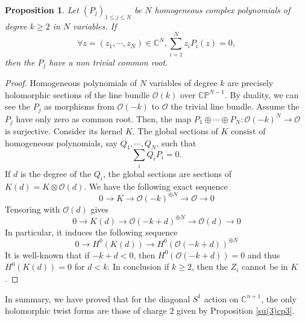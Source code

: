 \documentclass[12pt, reqno]{amsart}
\newtheorem{prop}[Def]{Proposition}
\newcommand{\C}{\mathbb{C}}
\newcommand{\p}{\mathbb{P}}
\newcommand{\Or}{\mathcal{O}}
\begin{document}
   \begin{prop}\label{nonexistence}
       Let $(P_j)_{1\leq j\leq N}$ be $N$ homogeneous complex polynomials of degree $k\geq 2$ in $N$ variables. If \[\forall z=(z_1,\cdots,z_N)\in\C^N,\sum_{i=1}^Nz_iP_i(z)=0,\] then the $P_j$ have a non trivial common root.  
   \end{prop}
\begin{proof}
 Homogeneous polynomials of $N$ variables of degree $k$ are precisely holomorphic sections of the line bundle $\Or(k)$ over $\C\p^{N-1}$. By duality, we can see the $P_j$ as morphisms from $\Or(-k)$ to $\Or$ the trivial line bundle. Assume the $P_j$ have only zero as common root. Then, the map $P_1\oplus\cdots\oplus P_N : \Or(-k)^N\to\Or$ is surjective. Consider its kernel $K$. The global sections of $K$ consist of homogeneous polynomials, say $Q_1,\cdots,Q_N$, such that \[\sum_iQ_iP_i=0.\] If $d$ is the degree of the $Q_i$, the global sections are sections of $K(d)=K\otimes\Or(d)$. We have the following exact sequence \[0\longrightarrow K\longrightarrow\Or(-k)^{\oplus N}\longrightarrow \Or\longrightarrow 0\]  Tensoring with $\Or(d)$ gives \[0\longrightarrow K(d)\longrightarrow\Or(-k+d)^{\oplus N}\longrightarrow\Or(d)\longrightarrow 0\] In particular, it induces the following sequence \[0\longrightarrow H^0(K(d))\longrightarrow H^0(\Or(-k+d))^{\oplus N}\] It is well-known that if $-k+d<0$, then $H^0(\Or(-k+d))=0$ and thus $H^0(K(d))=0$ for $d<k$. In conclusion if $k\geq 2$, then the $Z_i$ cannot be in $K$.
\end{proof}
In summary, we have proved that for the diagonal $S^1$ action on $\C^{n+1}$, the only holomorphic twist forms are those of charge $2$ given by Proposition \ref{su(3)cp3}.
\end{document}
